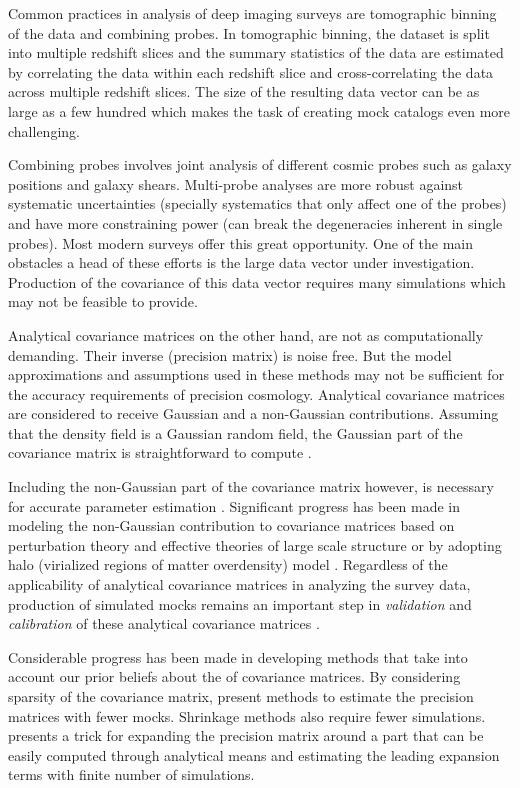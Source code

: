 Common practices in analysis of deep imaging surveys are tomographic binning of the data and combining probes.
In tomographic binning, the dataset is split into multiple redshift slices and the summary statistics of 
the data are estimated by correlating the data within each redshift slice and cross-correlating the data across 
multiple redshift slices. The size of the resulting data vector can be as large as a few hundred which makes the task of creating mock catalogs even more challenging. 

Combining probes involves joint analysis of different cosmic probes such as galaxy 
positions and galaxy shears. Multi-probe analyses are more robust against systematic 
uncertainties (specially systematics that only affect one of the probes) 
and have more constraining power (can break the degeneracies inherent in single probes). 
Most modern surveys offer this great opportunity. 
One of the main obstacles a head of these efforts is the large data vector under investigation. 
Production of the covariance of this data vector requires many simulations which may not 
be feasible to provide.   

Analytical covariance matrices on the other hand, are not as computationally demanding. 
Their inverse (precision matrix) is noise free. But the model approximations and assumptions used in these methods may not be sufficient for the accuracy requirements of precision cosmology. Analytical covariance matrices are considered to receive Gaussian and a non-Gaussian contributions. Assuming that the density field is a 
Gaussian random field, the Gaussian part of the covariance matrix is straightforward to compute \citep{grieb2016,klaus2016,slepian2016b}.

Including the non-Gaussian part of the covariance matrix however, is necessary for accurate parameter estimation \citep{takahashi2011,blot2016,chan2016}.
Significant progress has been made in modeling the non-Gaussian contribution to covariance matrices based on perturbation theory and effective theories of large scale structure \citep{mohammed_seljak,mohammed2017} or by adopting halo (virialized regions of matter overdensity) model \citep{takada_spergel,eifler2014}.
Regardless of the applicability of analytical covariance matrices in analyzing the survey data, production of simulated mocks remains an important step in \emph{validation} and \emph{calibration} of these analytical covariance matrices \citep{slepian2016b,hildebrandt2017}.

Considerable progress has been made in developing methods that take into account our prior beliefs 
about the of covariance matrices. By considering sparsity of the covariance matrix, \citet{paz2015,padmanabhan2016} 
present methods to estimate the precision matrices with fewer mocks. Shrinkage methods \citep{pope2008,joachimi2016} 
also require fewer simulations. \citet{fried2017} presents a trick for expanding the precision matrix 
around a part that can be easily computed through analytical means and estimating the leading expansion terms with finite number of simulations.

